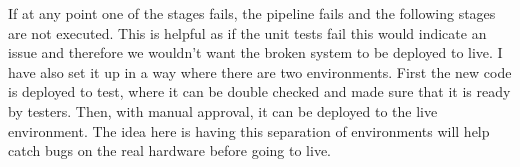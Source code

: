   If at any point one of the stages fails, the pipeline fails and the following stages are not executed. This is helpful as if the unit tests fail this would
  indicate an issue and therefore we wouldn't want the broken system to be deployed to live. I have also set it up in a way where there are two environments.
  First the new code is deployed to test, where it can be double checked and made sure that it is ready by testers. Then, with manual approval, it can be 
  deployed to the live environment. The idea here is having this separation of environments will help catch bugs on the real hardware before going to live.

\newpage